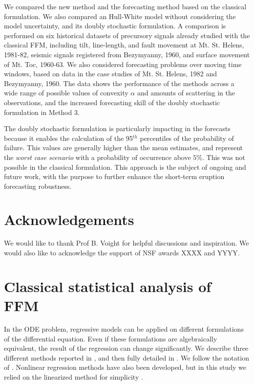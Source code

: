 \documentclass{article}
\begin{document}
We compared the new method and the forecasting method based on the classical formulation. We also compared an Hull-White model without considering the model uncertainty, and its doubly stochastic formulation. A comparison is performed on six historical datasets of precursory signals already studied with the classical FFM, including tilt, line-length, and fault movement at Mt. St. Helens, 1981-82, seismic signals registered from Bezymyanny, 1960, and surface movement of Mt. Toc, 1960-63. We also considered forecasting problems over moving time windows, based on data in the case studies of Mt. St. Helens, 1982 and Bezymyanny, 1960. The data shows the performance of the methods across a wide range of possible values of convexity $\alpha$ and amounts of scattering in the observations, and the increased forecasting skill of the doubly stochastic formulation in Method 3.

The doubly stochastic formulation is particularly impacting in the forecasts because it enables the calculation of the 95$^{th}$ percentiles of the probability of failure. This values are generally higher than the mean estimates, and represent the \emph{worst case scenario} with a probability of occurrence above $5\%$. This was not possible in the classical formulation. This approach is the subject of ongoing and future work, with the purpose to further enhance the short-term eruption forecasting robustness.

\section*{Acknowledgements}

We would like to thank Prof B. Voight for helpful discussions and inspiration. We would also like to acknowledge the support of NSF awards XXXX and YYYY.


\appendix
\section{Classical statistical analysis of FFM}\label{A-1}
In the ODE problem, regressive models can be applied on different formulations of the differential equation. Even if these formulations are algebraically equivalent, the result of the regression can change significantly. We describe three different methods reported in \cite{Voight1988}, and then fully detailed in \cite{Cornelius1995}. We follow the notation of \cite{Cornelius1995}. Nonlinear regression methods have also been developed, but in this study we relied on the linearized method for simplicity \citep{Bell2011}.
\end{document}
